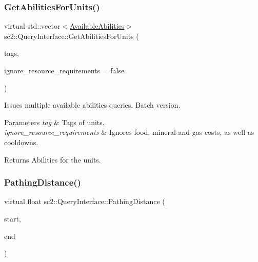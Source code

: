 \subsubsection{\texorpdfstring{Get\+Abilities\+For\+Units()}{GetAbilitiesForUnits()}}
{\footnotesize\ttfamily virtual std\+::vector$<$\hyperlink{structsc2_1_1_available_abilities}{Available\+Abilities}$>$ sc2\+::\+Query\+Interface\+::\+Get\+Abilities\+For\+Units (\begin{DoxyParamCaption}\item[{const std\+::vector$<$ Tag $>$ \&}]{tags,  }\item[{bool}]{ignore\+\_\+resource\+\_\+requirements = {\ttfamily false} }\end{DoxyParamCaption})\hspace{0.3cm}{\ttfamily [pure virtual]}}

Issues multiple available abilities queries. Batch version. 
\begin{DoxyParams}{Parameters}
{\em tag} & Tags of units. \\
\hline
{\em ignore\+\_\+resource\+\_\+requirements} & Ignores food, mineral and gas costs, as well as cooldowns. \\
\hline
\end{DoxyParams}
\begin{DoxyReturn}{Returns}
Abilities for the units. 
\end{DoxyReturn}
\mbox{\label{classsc2_1_1_query_interface_adf72c7556e59e82e231d9c58bd093546}} 
\subsubsection{\texorpdfstring{Pathing\+Distance()}{PathingDistance()}\hspace{0.1cm}{\footnotesize\ttfamily [1/2]}}
{\footnotesize\ttfamily virtual float sc2\+::\+Query\+Interface\+::\+Pathing\+Distance (\begin{DoxyParamCaption}\item[{const \hyperlink{structsc2_1_1_point2_d}{Point2D} \&}]{start,  }\item[{const \hyperlink{structsc2_1_1_point2_d}{Point2D} \&}]{end }\end{DoxyParamCaption})\hspace{0.3cm}{\ttfamily [pure virtual]}}


